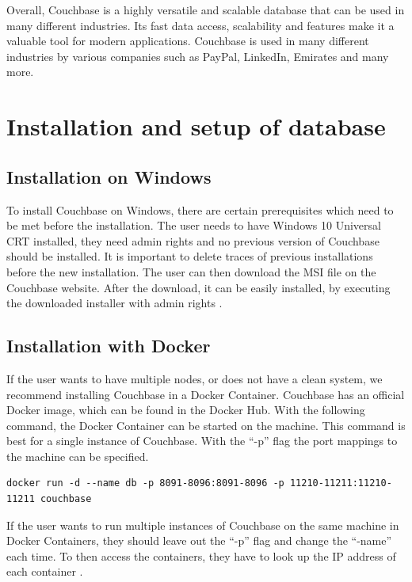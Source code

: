 Overall, Couchbase is a highly versatile and scalable database that can be used in many different industries. Its fast data access, scalability and features make it a valuable tool for modern applications. Couchbase is used in many different industries by various companies such as PayPal, LinkedIn, Emirates and many more.


\section{Installation and setup of database}

\subsection{Installation on Windows}

To install Couchbase on Windows, there are certain prerequisites which need to be met before the installation. The user needs to have Windows 10 Universal CRT installed, they need admin rights and no previous version of Couchbase should be installed. It is important to delete traces of previous installations before the new installation. The user can then download the MSI file on the Couchbase website. After the download, it can be easily installed, by executing the downloaded installer with admin rights \parencite{Couchbase.20230318}.

\subsection{Installation with Docker}

If the user wants to have multiple nodes, or does not have a clean system, we recommend installing Couchbase in a Docker Container. Couchbase has an official Docker image, which can be found in the Docker Hub. With the following command, the Docker Container can be started on the machine. This command is best for a single instance of Couchbase. With the ``-p'' flag the port mappings to the machine can be specified.

\begin{lstlisting}
docker run -d --name db -p 8091-8096:8091-8096 -p 11210-11211:11210-11211 couchbase
\end{lstlisting}

If the user wants to run multiple instances of Couchbase on the same machine in Docker Containers, they should leave out the ``-p'' flag and change the ``-name'' each time. To then access the containers, they have to look up the \ac{IP} address of each container \parencite{Couchbase.20230318b}.


